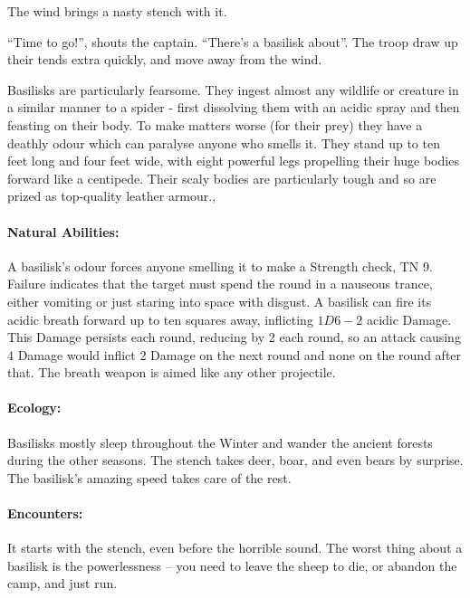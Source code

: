 \label{basilisk}
\basilisk

\begin{boxtext}

	The wind brings a nasty stench with it.

	``Time to go!'', shouts the captain.  ``There's a basilisk about''.  The troop draw up their tends extra quickly, and move away from the wind.

\end{boxtext}

Basilisks are particularly fearsome.  They ingest almost any wildlife or creature in a similar manner to a spider - first dissolving them with an acidic spray and then feasting on their body.  To make matters worse (for their prey) they have a deathly odour which can paralyse anyone who smells it.  They stand up to ten feet long and four feet wide, with eight powerful legs propelling their huge bodies forward like a centipede.  Their scaly bodies are particularly tough and so are prized as top-quality leather armour.,

	\paragraph{Natural Abilities:} A basilisk's odour forces anyone smelling it to make a Strength check, TN 9.  Failure indicates that the target must spend the round in a nauseous trance, either vomiting or just staring into space with disgust.  A basilisk can fire its acidic breath forward up to ten squares away, inflicting $1D6-2$ acidic Damage.  This Damage persists each round, reducing by 2  each round, so an attack causing 4 Damage would inflict 2  Damage on the next round and none on the round after that.  The breath weapon is aimed like any other projectile.

	\paragraph{Ecology:} Basilisks mostly sleep throughout the Winter and wander the ancient forests during the other seasons.  The stench takes deer, boar, and even bears by surprise.  The basilisk's amazing speed takes care of the rest.

	\paragraph{Encounters:} It starts with the stench, even before the horrible sound.  The worst thing about a basilisk is the powerlessness -- you need to leave the sheep to die, or abandon the camp, and just run.

